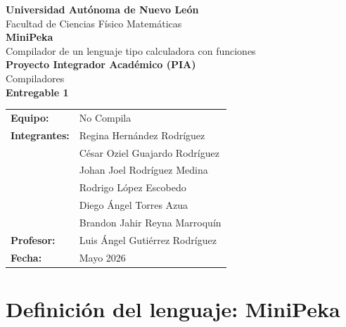 \documentclass[12pt]{article}
\begin{document}
\begin{titlepage}
\centering
\vspace*{1cm}

{\Large \textbf{Universidad Autónoma de Nuevo León}} \\[0.4cm]
{\large Facultad de Ciencias Físico Matemáticas} \\[2cm]

{\Huge \textbf{MiniPeka}} \\[0.3cm]
{\Large Compilador de un lenguaje tipo calculadora con funciones} \\[2cm]

{\large \textbf{Proyecto Integrador Académico (PIA)}} \\[0.2cm]
{\large Compiladores} \\[0.2cm]
{\large \textbf{Entregable 1}} \\[2cm]

\begin{tabular}{ll}
\textbf{Equipo:}      & No Compila \\[0.3cm]
\textbf{Integrantes:} & Regina Hernández Rodríguez \\
                      & César Oziel Guajardo Rodríguez \\
                      & Johan Joel Rodríguez Medina \\
                      & Rodrigo López Escobedo \\
                      & Diego Ángel Torres Azua \\
                      & Brandon Jahir Reyna Marroquín \\[0.5cm]
\textbf{Profesor:}    & Luis Ángel Gutiérrez Rodríguez \\[0.3cm]
\textbf{Fecha:}       & Mayo 2026 \\
\end{tabular}

\vfill
\end{titlepage}

\tableofcontents
\newpage

\section{Definición del lenguaje: MiniPeka}
\end{document}
